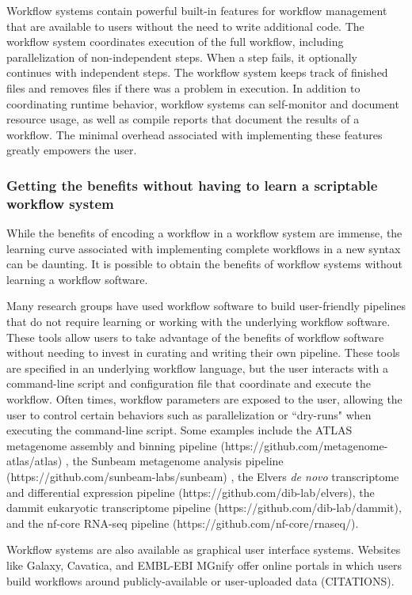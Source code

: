 \documentclass[10pt,letterpaper]{article}
\begin{document}
Workflow systems contain powerful built-in features for workflow management that are available to users without the need to write additional code.
The workflow system coordinates execution of the full workflow, including parallelization of non-independent steps. 
When a step fails, it optionally continues with independent steps.
The workflow system keeps track of finished files and removes files if there was a problem in execution.
In addition to coordinating runtime behavior, workflow systems can self-monitor and document resource usage, as well as compile reports that document the results of a workflow. 
The minimal overhead associated with implementing these features greatly empowers the user.

\subsubsection*{Getting the benefits without having to learn a scriptable workflow system}

While the benefits of encoding a workflow in a workflow system are immense, the learning curve associated with implementing complete workflows in a new syntax can be daunting. 
It is possible to obtain the benefits of workflow systems without learning a workflow software.

Many research groups have used workflow software to build user-friendly pipelines that do not require learning or working with the underlying workflow software.
These tools allow users to take advantage of the benefits of workflow software without needing to invest in curating and writing their own pipeline. 
These tools are specified in an underlying workflow language, but the user interacts with a command-line script and configuration file that coordinate and execute the workflow. 
Often times, workflow parameters are exposed to the user, allowing the user to control certain behaviors such as parallelization or ``dry-runs" when executing the command-line script.
Some examples include the ATLAS metagenome assembly and binning pipeline (https://github.com/metagenome-atlas/atlas) \cite{kieser2019atlas}, the Sunbeam metagenome analysis pipeline (https://github.com/sunbeam-labs/sunbeam) \cite{clarke2019sunbeam}, the Elvers \textit{de novo} transcriptome and differential expression pipeline (https://github.com/dib-lab/elvers), the dammit eukaryotic transcriptome pipeline (https://github.com/dib-lab/dammit), and the nf-core RNA-seq pipeline (https://github.com/nf-core/rnaseq/). 

Workflow systems are also available as graphical user interface systems.
Websites like Galaxy, Cavatica, and EMBL-EBI MGnify offer online portals in which users build workflows around publicly-available or user-uploaded data (CITATIONS).
\end{document}
